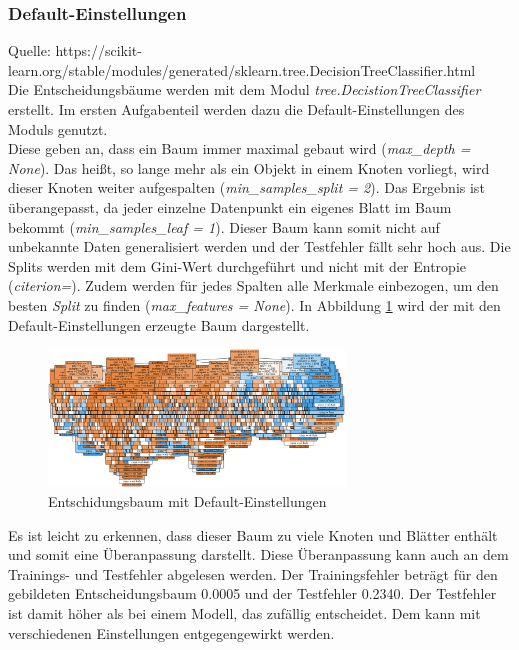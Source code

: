 \subsubsection{Default-Einstellungen}
Quelle: https://scikit-learn.org/stable/modules/generated/sklearn.tree.DecisionTreeClassifier.html\\
Die Entscheidungsbäume werden mit dem Modul \emph{tree.DecistionTreeClassifier} erstellt. Im ersten Aufgabenteil werden dazu die Default-Einstellungen des Moduls genutzt.\\
\noindent \hspace*{7mm}
Diese geben an, dass ein Baum immer maximal gebaut wird (\emph{max\_depth = None}). Das heißt, so lange mehr als ein Objekt in einem Knoten vorliegt, wird dieser Knoten weiter aufgespalten (\emph{min\_samples\_split = 2}). Das Ergebnis ist überangepasst, da jeder einzelne Datenpunkt ein eigenes Blatt im Baum bekommt (\emph{min\_samples\_leaf = 1}). Dieser Baum kann somit nicht auf unbekannte Daten generalisiert werden und der Testfehler fällt sehr hoch aus. Die Splits werden mit dem Gini-Wert durchgeführt und nicht mit der Entropie (\emph{citerion=}). Zudem werden für jedes Spalten alle Merkmale einbezogen, um den besten \emph{Split} zu finden (\emph{max\_features = None}). In Abbildung \ref{fig:treedefault} wird der mit den Default-Einstellungen erzeugte Baum dargestellt.
\begin{figure}[h]
	\centering
	\includegraphics[width = 0.7\textwidth]{Bilder/treedefault}
	\caption{Entschidungsbaum mit Default-Einstellungen}
	\label{fig:treedefault}
\end{figure}
Es ist leicht zu erkennen, dass dieser Baum zu viele Knoten und Blätter enthält und somit eine Überanpassung darstellt. Diese Überanpassung kann auch an dem Trainings- und Testfehler abgelesen werden. Der Trainingsfehler beträgt für den gebildeten Entscheidungsbaum 0.0005 und der Testfehler 0.2340. Der Testfehler ist damit höher als bei einem Modell, das zufällig entscheidet. Dem kann mit verschiedenen Einstellungen entgegengewirkt werden.
